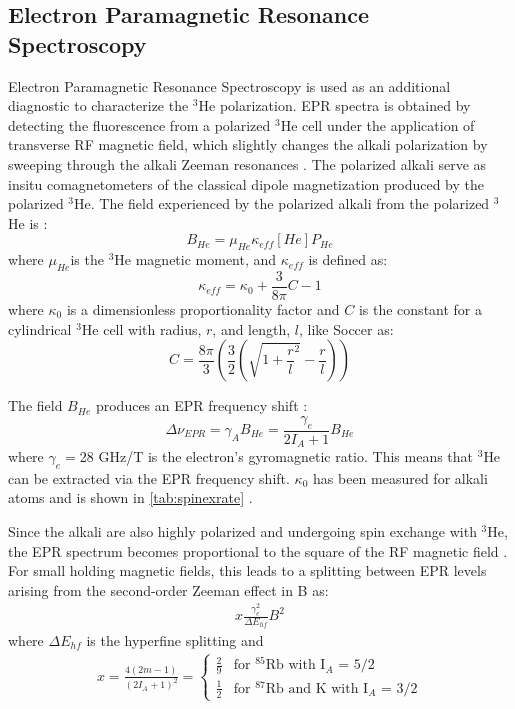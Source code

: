 \subsection{Electron Paramagnetic Resonance Spectroscopy}

Electron Paramagnetic Resonance Spectroscopy is used as an additional diagnostic to characterize the $^3$He polarization. EPR spectra is obtained by detecting the fluorescence from a polarized $^3$He cell under the application of transverse RF magnetic field, which slightly changes the alkali polarization by sweeping through the alkali Zeeman resonances \cite{Romalis1998, Chann2002a, Kramer2007}. The polarized alkali serve as insitu comagnetometers of the classical dipole magnetization produced by the polarized $^3$He. The field experienced by the polarized alkali from the polarized $^3$He is \cite{Romalis1998, Schaefer1989, Barton1994}:
\begin{equation}
    B_{He} = \mu_{He} \kappa_{eff} [He] P_{He}
\end{equation}
where $\mu_{He}$is the $^3$He magnetic moment, and $\kappa_{eff}$ is defined as:
\begin{equation}
    \kappa_{eff} = \kappa_0 + \frac{3}{8\pi}C-1
\end{equation}
where $\kappa_0$ is a dimensionless proportionality factor \cite{Romalis1998} and $C$ is the constant for a cylindrical $^3$He cell \cite{Chann2002} with radius, $r$, and length, $l$, like Soccer as:
\begin{equation}
    C = \frac{8\pi}{3} \left( \frac{3}{2} \left( \sqrt{1 + \frac{r}{l}^2} - \frac{r}{l} \right)  \right)  
\end{equation}

The field $B_{He}$ produces an EPR frequency shift \cite{Romalis1998}:
\begin{equation}
\label{eq:EPRshift}
    \Delta \nu_{EPR} = \gamma_A B_{He} = \frac{\gamma_e}{2 I_A + 1} B_{He}
\end{equation}
where $\gamma_e =$28 GHz/T is the electron's gyromagnetic ratio. This means that $^3$He can be extracted via the EPR frequency shift. $\kappa_0$ has been measured for alkali atoms and is shown in \cref{tab:spinexrate} \cite{Gentile2017}. 

Since the alkali are also highly polarized and undergoing spin exchange with $^3$He, the EPR spectrum becomes proportional to the square of the RF magnetic field \cite{Romalis1998}. For small holding magnetic fields, this leads to a splitting between EPR levels arising from the second-order Zeeman effect in B \cite{Gentile2017} as: 
\begin{align}
    x \frac{\gamma_e^2}{\Delta E_{hf}} B^2
\end{align}
where $\Delta E_{hf}$ is the hyperfine splitting and 
\begin{align}
x = \frac{4(2m-1)}{(2I_A+1)^2} =
    \begin{cases}
        \frac{2}{9} & \text{for $^{85}$Rb with I$_A$ = 5/2}\\
        \frac{1}{2} & \text{for $^{87}$Rb and K with I$_A$ = 3/2} 
    \end{cases}
\end{align}

